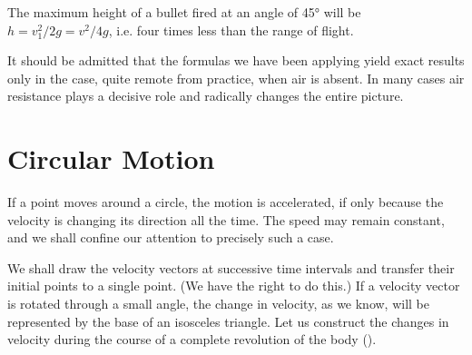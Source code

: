 The maximum height of a bullet fired at an angle of \ang{45} will be $h = v_{1}^{2}/2g = v^{2}/4g$, i.e. four times less than the range of flight.

It should be admitted that the formulas we have been
applying yield exact results only in the case, quite remote
from practice, when air is absent. In many cases air
resistance plays a decisive role and radically changes
the entire picture.


\section{Circular Motion}

If a point moves around a circle, the motion is accelerated, if only because the velocity is changing its direction all the time. The speed may remain constant, and we shall confine our attention to precisely such a case.

We shall draw the velocity vectors at successive time intervals and transfer their initial points to a single point. (We have the right to do this.) If a velocity vector is rotated through a small angle, the change in velocity, as we know, will be represented by the base of an isosceles triangle. Let us construct the changes in velocity during
the course of a complete revolution of the body ().


